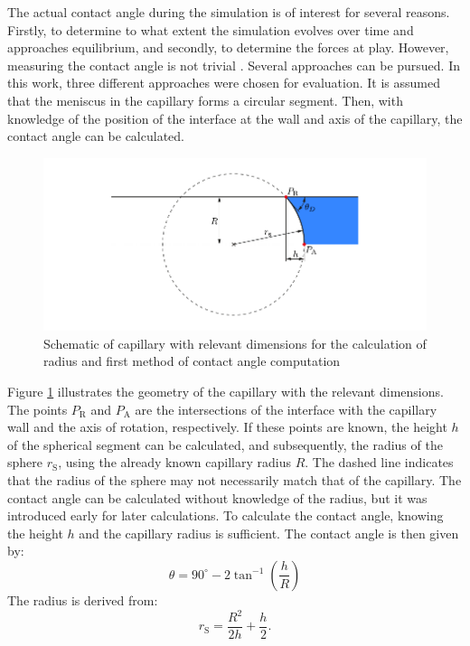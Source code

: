 The actual contact angle during the simulation is of interest for several reasons. Firstly, to determine to what extent the simulation evolves over time and approaches equilibrium, and secondly, to determine the forces at play. However, measuring the contact angle is not trivial \cite{carlson2011DissipationRapidDynamic}. Several approaches can be pursued. In this work, three different approaches were chosen for evaluation. It is assumed that the meniscus in the capillary forms a circular segment. Then, with knowledge of the position of the interface at the wall and axis of the capillary, the contact angle can be calculated.
\begin{figure}[h]
    \centering
    \includegraphics[width=.95\textwidth]{Pictures/RadiusCalc.pdf}
    \caption{Schematic of capillary with relevant dimensions for the calculation of radius and first method of contact angle computation}
    \label{fig: RadiusCalc}
\end{figure}
Figure \ref*{fig: RadiusCalc} illustrates the geometry of the capillary with the relevant dimensions. The points \(P_{\mathrm{R}}\) and \(P_{\mathrm{A}}\) are the intersections of the interface with the capillary wall and the axis of rotation, respectively. If these points are known, the height \(h\) of the spherical segment can be calculated, and subsequently, the radius of the sphere \(r_{\mathrm{S}}\), using the already known capillary radius \(R\). The dashed line indicates that the radius of the sphere may not necessarily match that of the capillary. The contact angle can be calculated without knowledge of the radius, but it was introduced early for later calculations. To calculate the contact angle, knowing the height \(h\) and the capillary radius is sufficient. The contact angle is then given by:
\begin{equation}
    \theta = 90^{\circ}- 2\tan^{-1}\left(\frac{h}{R}\right) 
\end{equation}
The radius is derived from:
\begin{equation}
    r_{\mathrm{S}} = \frac{R^2}{2h}+\frac{h}{2}.
\end{equation}

